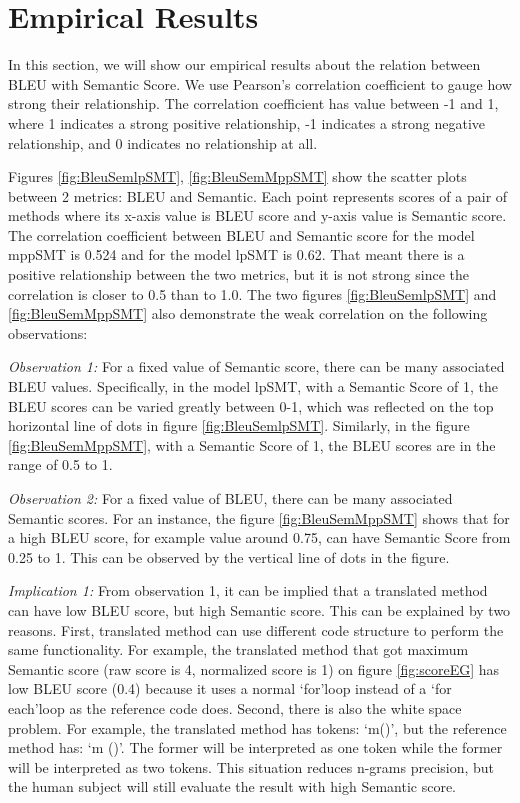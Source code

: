 \section{Empirical Results}
In this section, we will show our empirical results about the relation between BLEU with Semantic Score. We use Pearson\rq s correlation coefficient \cite{PearsonCorrelation}to gauge how strong their relationship. The correlation coefficient has value between -1 and 1, where 1 indicates a strong positive relationship, -1 indicates a strong negative relationship, and 0 indicates no relationship at all. 

Figures \ref{fig:BleuSemlpSMT}, \ref{fig:BleuSemMppSMT}  show the scatter plots between 2 metrics: BLEU and Semantic. Each point represents scores of a pair of methods where its x-axis value is BLEU score and y-axis value is Semantic score.
The correlation coefficient between BLEU and Semantic score for the model mppSMT is 0.524 and for the model lpSMT is 0.62. That meant there is a positive relationship between the two metrics, but it is not strong since the correlation is closer to 0.5 than to 1.0. The two figures \ref{fig:BleuSemlpSMT} and \ref{fig:BleuSemMppSMT} also demonstrate the weak correlation on the following observations:  

\emph{Observation 1:} For a fixed value of Semantic score, there can be many associated BLEU values. Specifically, in the model lpSMT, with a Semantic Score of 1, the BLEU scores can be varied greatly between 0-1, which was reflected on the top horizontal line of dots in figure \ref{fig:BleuSemlpSMT}. Similarly, in the figure \ref{fig:BleuSemMppSMT}, with a Semantic Score of 1, the BLEU scores are in the range of 0.5 to 1. 

\emph{Observation 2:} For a fixed value of BLEU, there can be many associated Semantic scores. For an instance, the figure \ref{fig:BleuSemMppSMT} shows that for a high BLEU score, for example value around 0.75, can have Semantic Score from 0.25 to 1. This can be observed by the vertical line of dots in the figure. 

\emph{Implication 1: }From observation 1, it can be implied that a translated method can have low BLEU score, but high Semantic score. This can be explained by two reasons. First, translated method can use different code structure to perform the same functionality. For example, the translated method that got maximum Semantic score (raw score is 4, normalized score is 1) on figure \ref{fig:scoreEG} has low BLEU score (0.4) because it uses a normal \lq for\rq  loop instead of a \lq for each\rq  loop as the reference code does. Second, there is also the white space problem. For example, the translated method has tokens: \lq m()\rq, but the reference method has: \lq m ()\rq. The former will be interpreted as one token while the former will be interpreted as two tokens. This situation reduces n-grams precision, but the human subject will still evaluate the result with high Semantic score.     

